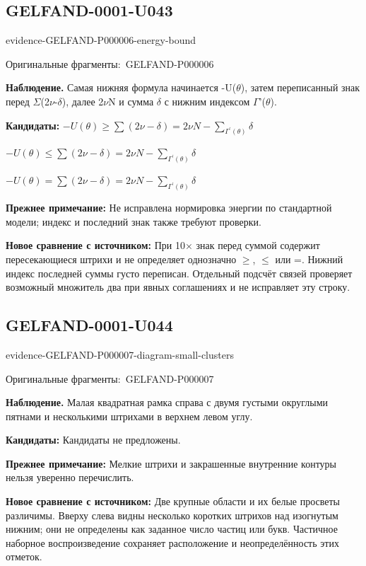 \documentclass[11pt]{article}
\newcommand{\EvidenceBlock}[4]{%
 \par\smallskip\noindent\begin{minipage}{\linewidth}
 \begin{minipage}[t]{.47\linewidth}\vspace{0pt}\centering
 \csname evidence-#1-#2\endcsname\par
 {\scriptsize\SourceCropCaption\ #1}\par
 \end{minipage}\hfill
 \begin{minipage}[t]{.49\linewidth}\vspace{0pt}\raggedright
 {\small\color{orange!65!black}\textbf{#4} #3}\par
 \end{minipage}
 \end{minipage}\par\smallskip}
\newcommand{\SourceCropCaption}{Оригинальные фрагменты:}\newcommand{\ReadingCaption}{Сомнительное чтение.}\newcommand{\IncompleteCaption}{Неразобранный фрагмент.}\newcommand{\DiagramCaption}{Рисунок и набранное описание.}
\begin{document}
\subsection*{GELFAND-0001-U043}
\EvidenceBlock{GELFAND-P000006}{energy-bound}{Самая нижняя формула начинается -U(\(\theta\)), затем переписанный знак перед \(\Sigma\)(2\(\nu\)-\(\delta\)), далее 2\(\nu\)N и сумма \(\delta\) с нижним индексом \(\Gamma\)'(\(\theta\)).}{Наблюдение.}
\par\smallskip\noindent\textbf{Кандидаты: } \(-U(\theta)\ge\sum(2\nu-\delta)=2\nu N-\sum_{\Gamma^{\prime}(\theta)}\delta\)\par\smallskip\(-U(\theta)\le\sum(2\nu-\delta)=2\nu N-\sum_{\Gamma^{\prime}(\theta)}\delta\)\par\smallskip\(-U(\theta)=\sum(2\nu-\delta)=2\nu N-\sum_{\Gamma^{\prime}(\theta)}\delta\)\par
\par\smallskip\noindent\textbf{Прежнее примечание: } Не исправлена нормировка энергии по стандартной модели; индекс и последний знак также требуют проверки.\par
\par\smallskip\noindent\textbf{Новое сравнение с источником: } При 10× знак перед суммой содержит пересекающиеся штрихи и не определяет однозначно \(\ge\), \(\le\) или =. Нижний индекс последней суммы густо переписан. Отдельный подсчёт связей проверяет возможный множитель два при явных соглашениях и не исправляет эту строку.\par

\subsection*{GELFAND-0001-U044}
\EvidenceBlock{GELFAND-P000007}{diagram-small-clusters}{Малая квадратная рамка справа с двумя густыми округлыми пятнами и несколькими штрихами в верхнем левом углу.}{Наблюдение.}
\par\smallskip\noindent\textbf{Кандидаты: } Кандидаты не предложены.\par
\par\smallskip\noindent\textbf{Прежнее примечание: } Мелкие штрихи и закрашенные внутренние контуры нельзя уверенно перечислить.\par
\par\smallskip\noindent\textbf{Новое сравнение с источником: } Две крупные области и их белые просветы различимы. Вверху слева видны несколько коротких штрихов над изогнутым нижним; они не определены как заданное число частиц или букв. Частичное наборное воспроизведение сохраняет расположение и неопределённость этих отметок.\par
\end{document}
